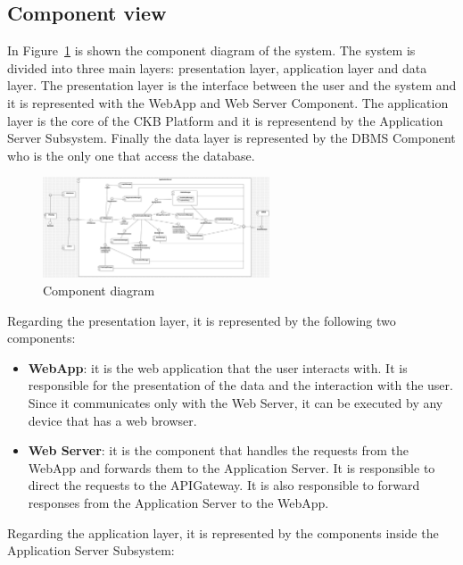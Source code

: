 \subsection{Component view}
In Figure\ \ref{fig:component_diagram} is shown the component diagram of the system. The system is divided into three main layers: presentation layer, application layer and data layer. The presentation layer is the interface between the user and the system and it is represented with the WebApp and Web Server Component. The application layer is the core of the CKB Platform and it is representend by the Application Server Subsystem. Finally the data layer is represented by the DBMS Component who is the only one that access the database.
\begin{figure}[H]
    \centering
    \includegraphics[angle=90,origin=c,width=0.6\textwidth]{Diagrams/ComponentDiagram.jpg}
    \caption{Component diagram}
    \label{fig:component_diagram}
\end{figure}
\clearpage
Regarding the presentation layer, it is represented by the following two components:
\begin{itemize}
    \item \textbf{WebApp}: it is the web application that the user interacts with. It is responsible for the presentation of the data and the interaction with the user. Since it communicates only with the Web Server, it can be executed by any device that has a web browser.
    \item \textbf{Web Server}: it is the component that handles the requests from the WebApp and forwards them to the Application Server. It is responsible to direct the requests to the APIGateway. It is also responsible to forward responses from the Application Server to the WebApp.
\end{itemize}
Regarding the application layer, it is represented by the components inside the Application Server Subsystem:
